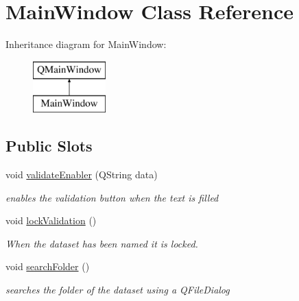 \hypertarget{class_main_window}{}\section{Main\+Window Class Reference}
\label{class_main_window}
Inheritance diagram for Main\+Window\+:\begin{figure}[H]
\begin{center}
\leavevmode
\includegraphics[height=2.000000cm]{class_main_window}
\end{center}
\end{figure}
\subsection*{Public Slots}
\begin{DoxyCompactItemize}
\item 
void \hyperlink{class_main_window_ab231326d40a58616a2a6c194a95f40af}{validate\+Enabler} (Q\+String data)
\begin{DoxyCompactList}\small\item\em enables the validation button when the text is filled \end{DoxyCompactList}\item 
void \hyperlink{class_main_window_afc77791f1b130480a0c9364a999283d7}{lock\+Validation} ()\hypertarget{class_main_window_afc77791f1b130480a0c9364a999283d7}{}\label{class_main_window_afc77791f1b130480a0c9364a999283d7}

\begin{DoxyCompactList}\small\item\em When the dataset has been named it is locked. \end{DoxyCompactList}\item 
void \hyperlink{class_main_window_aa2762bc39780ff9bc5c533ef4581d07d}{search\+Folder} ()\hypertarget{class_main_window_aa2762bc39780ff9bc5c533ef4581d07d}{}\label{class_main_window_aa2762bc39780ff9bc5c533ef4581d07d}

\begin{DoxyCompactList}\small\item\em searches the folder of the dataset using a Q\+File\+Dialog \end{DoxyCompactList}\end{DoxyCompactItemize}
